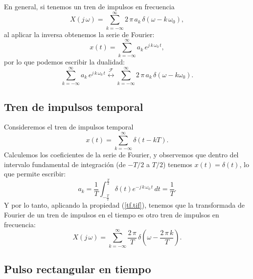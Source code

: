 \documentclass[11pt,a4paper,openany]{book}
\begin{document}
En general, si tenemos un tren de impulsos en frecuencia
\begin{equation}
	X(j \, \omega) = \sum_{k=-\infty}^{\infty} 2 \, \pi \, a_{k} \, \delta(\omega - k \, \omega_{0}) ,
\end{equation}
al aplicar la inversa obtenemos la serie de Fourier:
\begin{equation}
	x(t) = \sum_{k=-\infty}^{\infty} a_{k} \, e^{j \, k \, \omega_{0} \, t},
\end{equation}
por lo que podemos escribir la dualidad:
\begin{equation}
	\sum_{k=-\infty}^{\infty} a_{k} \, e^{j \, k \, \omega_{0} \, t} 
	\stackrel{\mathcal{F}}{\longleftrightarrow}
	\sum_{k=-\infty}^{\infty} 2 \, \pi \, a_{k} \, \delta(\omega - k \omega_{0}). \label{tf.tif}
\end{equation}

\subsection{Tren de impulsos temporal}

Consideremos el tren de impulsos temporal
\begin{equation}
	x(t) = \sum_{k=-\infty}^{\infty} \delta(t - kT) .
\end{equation}
Calculemos los coeficientes de la serie de Fourier, y observemos que dentro del intervalo fundamental de integración (de $-T/2$ a $T/2$) tenemos $x(t) = \delta(t)$, lo que permite escribir:
\begin{equation}
	a_{k} = \frac{1}{T} \int_{-\frac{T}{2}}^{\frac{T}{2}} \delta(t) e^{-j \, k \, \omega_{0} \, t} \, dt = \frac{1}{T}.
\end{equation}
Y por lo tanto, aplicando la propiedad (\ref{tf.tif}), tenemos que la transformada de Fourier de un tren de impulsos en el tiempo es otro tren de impulsos en frecuencia:
\begin{equation}
	X(j \, \omega) = \sum_{k=-\infty}^{\infty} \frac{2 \, \pi}{T} \, \delta\left(\omega - \frac{2 \, \pi \, k}{T}\right).
\end{equation}

\subsection{Pulso rectangular en tiempo}
\end{document}
